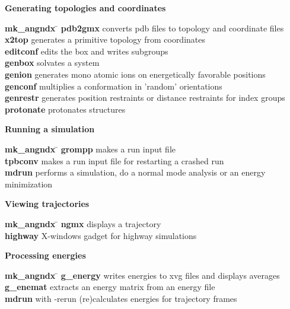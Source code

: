 \begin{description}
\item {\large\bf Generating topologies and coordinates}
\vspace{-2ex}\begin{tabbing}
{\bf mk\_angndx} \= \kill
{\bf pdb2gmx} \> converts pdb files to topology and coordinate files \\
{\bf x2top} \> generates a primitive topology from coordinates  \\
{\bf editconf} \> edits the box and writes subgroups  \\
{\bf genbox} \> solvates a system \\
{\bf genion} \> generates mono atomic ions on energetically favorable positions \\
{\bf genconf} \> multiplies a conformation in 'random' orientations \\
{\bf genrestr} \> generates position restraints or distance restraints for index groups \\
{\bf protonate} \> protonates structures \\
\end{tabbing}\vspace{-2ex}

\item {\large\bf Running a simulation}
\vspace{-2ex}\begin{tabbing}
{\bf mk\_angndx} \= \kill
{\bf grompp} \> makes a run input file \\
{\bf tpbconv} \> makes a run input file for restarting a crashed run \\
{\bf mdrun} \> performs a simulation, do a normal mode analysis or an energy minimization \\
\end{tabbing}\vspace{-2ex}

\item {\large\bf Viewing trajectories}
\vspace{-2ex}\begin{tabbing}
{\bf mk\_angndx} \= \kill
{\bf ngmx} \> displays a trajectory \\
{\bf highway} \> X-windows gadget for highway simulations \\
\end{tabbing}\vspace{-2ex}

\item {\large\bf Processing energies}
\vspace{-2ex}\begin{tabbing}
{\bf mk\_angndx} \= \kill
{\bf g\_energy} \> writes energies to xvg files and displays averages \\
{\bf g\_enemat} \> extracts an energy matrix from an energy file \\
{\bf mdrun} \> with -rerun (re)calculates energies for trajectory frames \\
\end{tabbing}\vspace{-2ex}


\end{description}
